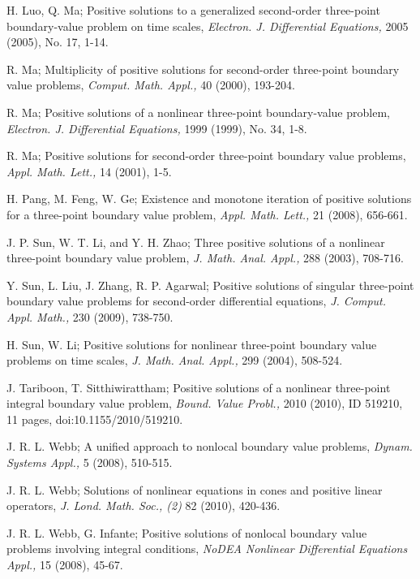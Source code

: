 \documentclass[reqno]{amsart}\usepackage{amsmath}
\begin{document}
\begin{thebibliography}{9}
 H. Luo, Q. Ma; Positive solutions to a generalized second-order
three-point boundary-value problem on time scales, \emph{Electron. J. Differential Equations,} 2005 (2005), No. 17, 1-14.

 R. Ma; Multiplicity of positive solutions for second-order
three-point boundary value problems, \emph{Comput. Math. Appl.,} 40 (2000), 193-204.

 R. Ma; Positive solutions of a nonlinear three-point boundary-value
problem, \emph{Electron. J. Differential Equations,} 1999 (1999), No. 34,
1-8.

 R. Ma; Positive solutions for second-order three-point boundary
value problems, \emph{Appl. Math. Lett.,} 14 (2001), 1-5.


 H. Pang, M. Feng, W. Ge; Existence and monotone iteration of
positive solutions for a three-point boundary value problem, \emph{Appl.
Math. Lett.,} 21 (2008), 656-661.


 J. P. Sun, W. T. Li, and Y. H. Zhao; Three positive solutions of a nonlinear three-point
boundary value problem, \emph{J. Math. Anal. Appl.,} 288 (2003), 708-716.


 Y. Sun, L. Liu, J. Zhang, R. P. Agarwal; Positive solutions of
singular three-point boundary value problems for second-order
differential equations, \emph{J. Comput. Appl. Math.,} 230 (2009),
738-750.

 H. Sun, W. Li; Positive solutions for nonlinear three-point boundary
value problems on time scales, \emph{J. Math. Anal. Appl.,} 299 (2004), 508-524.

 J. Tariboon, T. Sitthiwirattham; Positive solutions of a nonlinear
three-point integral boundary value problem, \emph{Bound. Value Probl.,}
2010 (2010), ID 519210, 11 pages, doi:10.1155/2010/519210.






 J. R. L. Webb; A unified approach to nonlocal boundary value problems,
\emph{Dynam. Systems Appl.,} 5 (2008), 510-515.

 J. R. L. Webb; Solutions of nonlinear equations in cones and positive
linear operators, \emph{J. Lond. Math. Soc., (2)} 82 (2010), 420-436.

 J. R. L. Webb, G. Infante; Positive solutions of nonlocal boundary value
problems involving integral conditions, \emph{NoDEA Nonlinear Differential Equations Appl.,} 15 (2008), 45-67.


\end{thebibliography}
\end{document}
